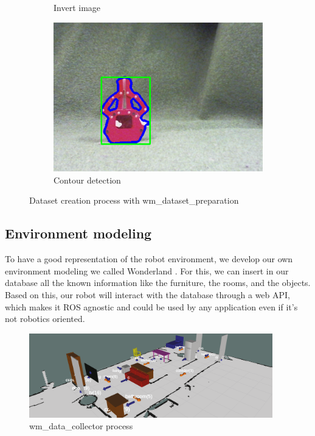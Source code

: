 \documentclass[runningheads,a4paper]{llncs}
\begin{document}
\begin{figure}[h!]
\begin{subfigure}[b]{0.3\linewidth}
    \caption{Invert image}
  \end{subfigure}
  \begin{subfigure}[b]{0.3\linewidth}
    \includegraphics[width=\linewidth]{images/bounding_contours.png}
    \caption{Contour detection}
  \end{subfigure}
  \caption{Dataset creation process with wm\_dataset\_preparation}
  \label{fig:coffee}
\end{figure}  
 
\subsection{Environment modeling}
\tab To have a good representation of the robot environment, we develop our own environment modeling we called Wonderland \cite{wonderland}. For this, we can insert in our database all the known information like the furniture, the rooms, and the objects. Based on this, our robot will interact with the database through a web API, which makes it ROS agnostic and could be used by any application even if it's not robotics oriented.\\

\begin{figure}
  \centering
  \includegraphics[width=300pt]{images/wonderland.png}
  \caption{ wm\_data\_collector process}
\end{figure} 
\end{document}
